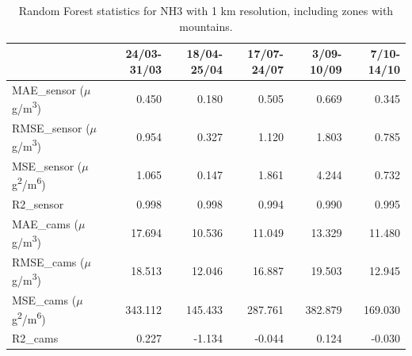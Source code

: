 \begin{table}[H]
\begin{tabular}{lrrrrr}
\toprule
 &  24/03-31/03 &  18/04-25/04 &  17/07-24/07 &  3/09-10/09 &  7/10-14/10 \\
\midrule
 MAE\_sensor ($\mu$g/m\textsuperscript{3})&        0.450 &        0.180 &        0.505 &       0.669 &       0.345 \\
RMSE\_sensor ($\mu$g/m\textsuperscript{3})&        0.954 &        0.327 &        1.120 &       1.803 &       0.785 \\
 MSE\_sensor ($\mu$g\textsuperscript{2}/m\textsuperscript{6})&        1.065 &        0.147 &        1.861 &       4.244 &       0.732 \\
  R2\_sensor &        0.998 &        0.998 &        0.994 &       0.990 &       0.995 \\
   MAE\_cams ($\mu$g/m\textsuperscript{3})&       17.694 &       10.536 &       11.049 &      13.329 &      11.480 \\
  RMSE\_cams ($\mu$g/m\textsuperscript{3})&       18.513 &       12.046 &       16.887 &      19.503 &      12.945 \\
   MSE\_cams ($\mu$g\textsuperscript{2}/m\textsuperscript{6})&      343.112 &      145.433 &      287.761 &     382.879 &     169.030 \\
    R2\_cams &        0.227 &       -1.134 &       -0.044 &       0.124 &      -0.030 \\
\bottomrule
\end{tabular}
\caption{Random Forest statistics for NH3 with 1 km resolution, including zones with mountains.}
\end{table}
